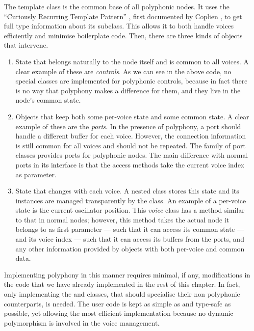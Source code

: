 The  template class is the common base of all
polyphonic nodes. It uses the ``Curiously Recurring Template Pattern''
, first documented by
Coplien \cite{coplien95crt}, to get full type information about its
subclass. This allows it to both handle voices efficiently and
minimise boilerplate code. Then, there are three kinds of objects that
intervene.
\begin{enumerate}
\item State that belongs naturally to the node itself and is common to
  all voices. A clear example of these are \emph{controls}. As we can
  see in the above code, no special classes are implemented for
  polyphonic controls, because in fact there is no way that polyphony
  makes a difference for them, and they live in the node's common
  state.

\item Objects that keep both some per-voice state and some common
  state. A clear example of these are the \emph{ports}. In the
  presence of polyphony, a port should handle a different buffer for
  each voice. However, the connection information is still common for
  all voices and should not be repeated. The 
  family of port classes provides ports for polyphonic nodes. The main
  difference with normal ports in its interface is that the access
  methods take the current voice index as parameter.

\item State that changes with each voice. A nested  class
  stores this state and its instances are managed transparently by the
   class. An example of a per-voice state is the
  current oscillator position. This \emph{voice} class has a
   method similar to that in normal nodes;
  however, this method takes the actual node it belongs to as first
  parameter --- such that it can access its common state --- and its
  voice index --- such that it can access its buffers from the ports,
  and any other information provided by objects with both per-voice
  and common data. 
\end{enumerate}

Implementing polyphony in this manner requires minimal, if any,
modifications in the code that we have already implemented in the rest
of this chapter. In fact, only implementing the 
and  classes, that should specialise their non
polyphonic counterparts, is needed. The user code is kept as simple as
and type-safe as possible, yet allowing the most efficient
implementation because no dynamic polymorphism is involved in the
voice management.

